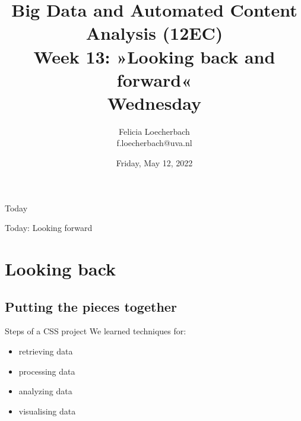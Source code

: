 \documentclass[compress]{beamer}
\begin{document}
\title[Big Data and Automated Content Analysis]{\textbf{Big Data and Automated Content Analysis (12EC)} 
\\Week 13: »Looking back and forward«
\\Wednesday}
\author[Felicia Loecherbach]{Felicia Loecherbach\\ \footnotesize{f.loecherbach@uva.nl \\}}
\date{Friday, May 12, 2022}


\begin{frame}{}
	\titlepage
\end{frame}

\begin{frame}{Today}
	\tableofcontents
\end{frame}


\begin{frame}[standout]
Today: Looking forward
\end{frame}




\section{Looking back}
\subsection{Putting the pieces together}


\begin{frame}{Steps of a CSS project}
We learned techniques for:
\begin{itemize}
\item retrieving data
\item processing data
\item analyzing data
\item visualising data
\end{itemize}
	
\end{frame}
\end{document}
